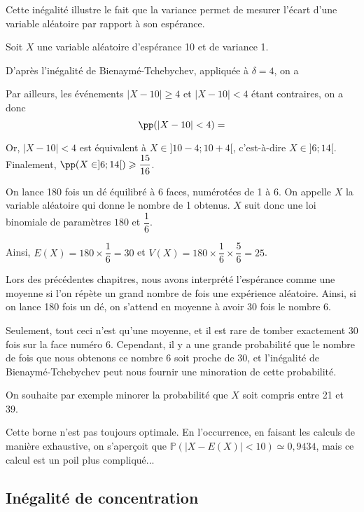 \documentclass[11pt,fleqn, openany]{book} %
\begin{document}
Cette inégalité illustre le fait que la variance permet de mesurer l'écart d'une variable aléatoire par rapport à son espérance.

\begin{example}Soit $X$ une variable aléatoire d'espérance 10 et de variance 1.

D'après l'inégalité de Bienaymé-Tchebychev, appliquée à $\delta = 4$, on a 

Par ailleurs, les événements $|X-10|\geqslant 4$ et $|X-10|<4$ étant contraires, on a donc \[\pp(|X-10|< 4) = \]

Or, $|X-10|<4$ est équivalent à $X \in ]10-4 ; 10+4[$, c'est-à-dire $X\in ]6 ; 14[$. Finalement, $\pp(X\in ]6 ;14[) \geqslant \dfrac{15}{16}$.\end{example}

\begin{example} On lance 180 fois un dé équilibré à 6 faces, numérotées de 1 à 6. On appelle $X$ la variable aléatoire qui donne le nombre de 1 obtenus. $X$ suit donc une loi binomiale de paramètres $180$ et $\dfrac{1}{6}$.

Ainsi, $E(X)=180 \times \dfrac{1}{6}=30$ et $V(X)=180 \times \dfrac{1}{6} \times \dfrac{5}{6}=25$. 

Lors des précédentes chapitres, nous avons interprété l'espérance comme une moyenne si l'on répète un grand nombre de fois une expérience aléatoire. Ainsi, si on lance 180 fois un dé, on s'attend en moyenne à avoir 30 fois le nombre 6.

Seulement, tout ceci n'est qu'une moyenne, et il est rare de tomber exactement 30 fois sur la face numéro 6. Cependant, il y a une grande probabilité que le nombre de fois que nous obtenons ce nombre 6 soit proche de 30, et l'inégalité de Bienaymé-Tchebychev peut nous fournir une minoration de cette probabilité.


On souhaite par exemple minorer la probabilité que $X$ soit compris entre 21 et 39. 

\vskip170pt
\end{example}

Cette borne n'est pas toujours optimale. En l'occurrence, en faisant les calculs de manière exhaustive, on s'aperçoit que $\mathbb{P}( |X-E(X)| < 10) \simeq 0,9434$, mais ce calcul est un poil plus compliqué...



\subsection{Inégalité de concentration}
\end{document}

